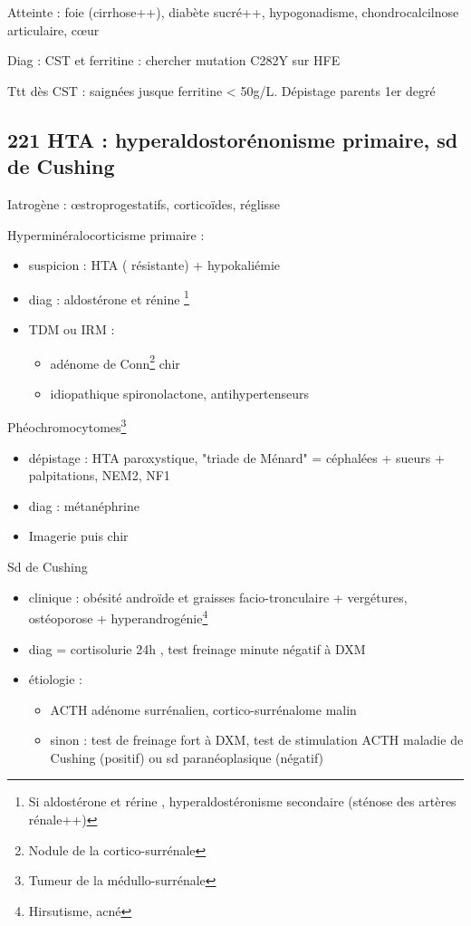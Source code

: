 \documentclass[11pt]{article}
\begin{document}
Atteinte : foie (cirrhose++), diabète sucré++, hypogonadisme, chondrocalcilnose
articulaire, c\oe{}ur

Diag : CST \inc et ferritine \inc : chercher mutation C282Y sur HFE

Ttt dès CST \inc : saignées jusque ferritine < 50g/L. Dépistage parents 1er degré
\subsection{221 HTA : hyperaldostorénonisme primaire, sd de Cushing}
\label{sec:org2372883}
\label{org8289fb5}
Iatrogène : \oe{}stroprogestatifs, corticoïdes, réglisse

Hyperminéralocorticisme primaire : 
\begin{itemize}
\item suspicion : HTA (\textpm{} résistante) + hypokaliémie
\item diag : aldostérone \inc et rénine \dec \footnote{Si aldostérone \inc et rérine \inc, hyperaldostéronisme secondaire
(sténose des artères rénale++)}
\item TDM ou IRM : 
\begin{itemize}
\item adénome de Conn\footnote{Nodule de la cortico-surrénale} \thus chir
\item idiopathique \thus spironolactone, antihypertenseurs
\end{itemize}
\end{itemize}

Phéochromocytomes\footnote{Tumeur de la médullo-surrénale}
\begin{itemize}
\item dépistage : HTA paroxystique, "triade de Ménard" = céphalées + sueurs +
palpitations, NEM2, NF1
\item diag : métanéphrine \inc
\item Imagerie puis chir
\end{itemize}
Sd de Cushing
\begin{itemize}
\item clinique : obésité androïde et graisses facio-tronculaire + vergétures,
ostéoporose + hyperandrogénie\footnote{Hirsutisme, acné}
\item diag = cortisolurie 24h \inc, test freinage minute négatif à DXM
\item étiologie :
\begin{itemize}
\item ACTH \dec \thus adénome surrénalien, cortico-surrénalome malin
\item sinon : test de freinage fort à DXM, test de stimulation ACTH \thus maladie
de Cushing (positif) ou sd paranéoplasique (négatif)
\end{itemize}
\end{itemize}
\end{document}
